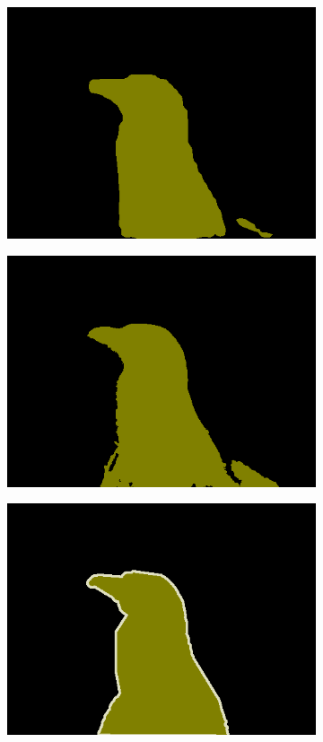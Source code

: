 \documentclass{article} %
\begin{document}
\begin{figure}[t]
\begin{subfigure}[b]{0.19\linewidth}
    \includegraphics[width=\textwidth]{figs/ab/context/2007_008051}
  \end{subfigure}
  \begin{subfigure}[b]{0.19\linewidth}
    \includegraphics[width=\textwidth]{figs/ab/crf/2007_008051}
  \end{subfigure}
  \begin{subfigure}[b]{0.19\linewidth}
    \includegraphics[width=\textwidth]{figs/ab/gt/2007_008051}

\end{subfigure}
\end{figure}
\end{document}
